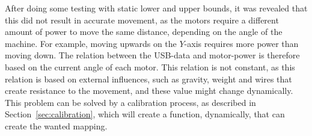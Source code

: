 After doing some testing with static lower and upper bounds, it was revealed that this did not result in accurate movement, as the motors require a different amount of power to move the same distance, depending on the angle of the machine.
For example, moving upwards on the $Y$-axis requires more power than moving down.
The relation between the USB-data and motor-power is therefore based on the current angle of each motor.
This relation is not constant, as this relation is based on external influences, such as gravity, weight and wires that create resistance to the movement, and these value might change dynamically.
This problem can be solved by a calibration process, as described in Section~\ref{sec:calibration}, which will create a function, dynamically, that can create the wanted mapping.